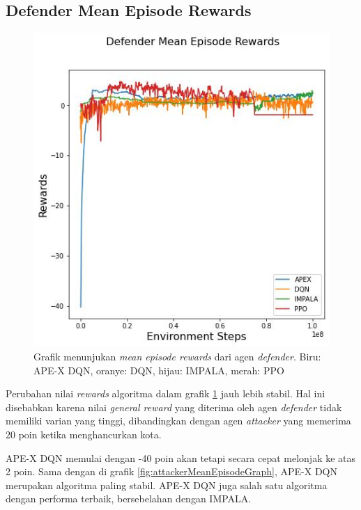 \subsection{Defender Mean Episode Rewards}

\begin{figure}[H]
  \centering
    \includegraphics[scale=0.9]{gambar/defender_reward_mean.jpg}
    \caption{Grafik menunjukan \emph{mean episode rewards} dari agen \emph{defender}.
    Biru: APE-X DQN, oranye: DQN, hijau: IMPALA, merah: PPO}
    \label{fig:defenderMeanEpisodeGraph}
\end{figure}

Perubahan nilai \emph{rewards} algoritma dalam grafik \ref{fig:defenderMeanEpisodeGraph} jauh lebih stabil.
Hal ini disebabkan karena nilai \emph{general reward} yang diterima oleh agen \emph{defender} tidak memiliki varian yang tinggi,
dibandingkan dengan agen \emph{attacker} yang memerima 20 poin ketika menghancurkan kota.

APE-X DQN memulai dengan -40 poin akan tetapi secara cepat melonjak ke atas 2 poin.
Sama dengan di grafik \ref{fig:attackerMeanEpisodeGraph}, APE-X DQN merupakan algoritma paling stabil.
APE-X DQN juga salah satu algoritma dengan performa terbaik, bersebelahan dengan IMPALA.

